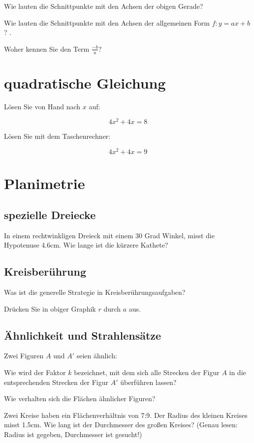 Wie lauten die Schnittpunkte mit den Achsen der obigen Gerade?

Wie lauten die Schnittpunkte mit den Achsen der allgemeinen Form $f: y=ax+b$? .

Woher kennen Sie den Term $\frac{-b}{a}$?

\section{quadratische Gleichung}
Lösen Sie von Hand nach $x$ auf:

$$4x^2 +4x = 8$$

Lösen Sie mit dem Taschenrechner:

$$4x^2 + 4x = 9$$


\section{Planimetrie}
\subsection{spezielle Dreiecke}
In einem rechtwinkligen Dreieck mit einem 30 Grad Winkel, misst die Hypotenuse 4.6cm. Wie lange ist die kürzere Kathete? 

\subsection{Kreisberührung}
Was ist die generelle Strategie in Kreisberührungsaufgaben?

Drücken Sie in obiger Graphik $r$ durch $a$ aus.
\subsection{Ähnlichkeit und Strahlensätze}
Zwei Figuren $A$ und $A'$ seien ähnlich:

Wie wird der Faktor $k$ bezeichnet, mit dem sich alle Strecken der Figur $A$ in die entsprechenden Strecken der Figur $A'$ überführen lassen?

Wie verhalten sich die Flächen ähnlicher Figuren?

Zwei Kreise haben ein Flächenverhältnis von 7:9. Der Radius des
kleinen Kreises misst 1.5cm. Wie lang ist der Durchmesser des großen
Kreises? (Genau lesen: Radius ist gegeben, Durchmesser ist gesucht!)



